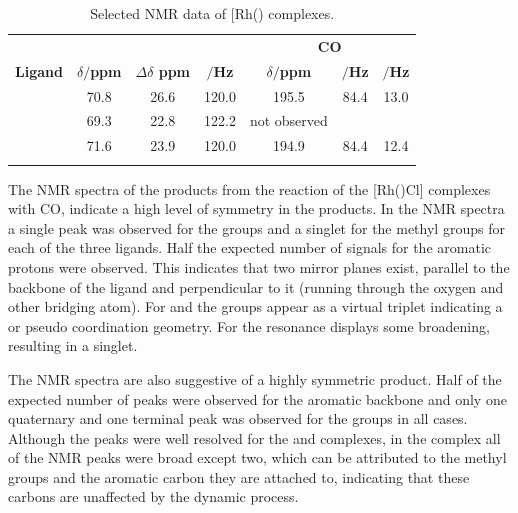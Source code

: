 
\begin{table}[htbp]
\caption[Selected NMR data of [Rh(\tBuxantphos)\ce{(CO)2Cl}{]} complexes]{Selected NMR data of [Rh(\tBuxantphos)\ce{(CO)2Cl]} complexes.}
\vspace{1em}
\label{table:rhodiumcarbonyl}
\small
\begin{center}
\begin{tabular}{l c c c c c c}
	\toprule{}
	~ & \multicolumn{3}{c}{\bfseries{\phosphorus}} & \multicolumn{3}{c}{\bfseries{\carbon{} CO}} \\
	\cmidrule(lr){2-4} \cmidrule(lr){5-7}
	\bfseries{Ligand}&\bfseries{$\delta/$ppm}&\bfseries{$\Delta\delta$ ppm}&\bfseries{\JRhP{}$/$Hz}&\bfseries{$\delta/$ppm}&\bfseries{\JRhC $/$Hz}&\bfseries{\JPC $/$Hz}\\
	\midrule{}
	\tBuSixantphos	&	70.8	&	26.6 & 120.0	&	195.5	& 84.4	& 13.0\\
	\tBuThixantphos	& 	69.3	&	22.8	& 122.2	&	not observed	& 	& \\
	\tBuXantphos	&	71.6	&	23.9	& 120.0	&	194.9	& 84.4	& 12.4\\
	\bottomrule{}
\end{tabular}
\end{center}
\end{table}


The NMR spectra of the products from the reaction of the [Rh(\tBuxantphos)Cl] complexes with CO, indicate a high level of symmetry in the products.  In the \proton{} NMR spectra a single peak was observed for the \tBu{} groups and a singlet for the methyl groups for each of the three ligands.  Half the expected number of signals for the aromatic protons were observed.  This indicates that two mirror planes exist, parallel to the backbone of the ligand and perpendicular to it (running through the oxygen and other bridging atom).  For \tBusixantphos{} and \tBuxantphos{} the \tBu{} groups appear as a virtual triplet indicating a \trans{} or pseudo \trans{} coordination geometry.  For \tButhixantphos{} the \tBu{} resonance displays some broadening, resulting in a singlet.

The \carbon{} NMR spectra are also suggestive of a highly symmetric product.  Half of the expected number of peaks were observed for the aromatic backbone and only one quaternary and one terminal peak was observed for the \tBu{} groups in all cases.  Although the peaks were well resolved for the \tBusixantphos{} and \tBuxantphos{} complexes, in the \tButhixantphos{} complex all of the \carbon{} NMR peaks were broad except two, which can be attributed to the methyl groups and the aromatic carbon they are attached to, indicating that these carbons are unaffected by the dynamic process.  

